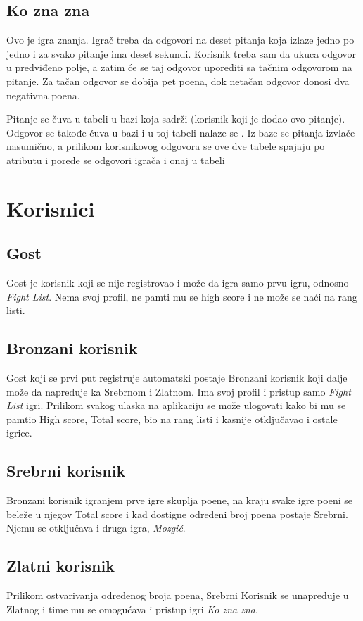 \documentclass{article}
\begin{document}
\subsection{Ko zna zna}
Ovo je igra znanja. Igrač treba da odgovori na deset pitanja koja izlaze jedno po jedno i 
za svako pitanje ima deset sekundi. Korisnik treba sam da ukuca odgovor u predviđeno polje, a 
zatim će se taj odgovor uporediti sa tačnim odgovorom na pitanje. Za tačan odgovor se dobija 
pet poena, dok netačan odgovor donosi dva negativna poena.
\par Pitanje se čuva u tabeli u bazi koja sadrži  (korisnik koji je 
dodao ovo pitanje). Odgovor se takođe čuva u bazi i u toj tabeli nalaze se . Iz baze se pitanja izvlače nasumično, a prilikom korisnikovog odgovora se ove dve 
tabele spajaju po atributu  i porede se odgovori igrača i onaj u tabeli
\newpage
\section{Korisnici}
\subsection{Gost}
Gost je korisnik koji se nije registrovao i može da igra samo prvu igru, odnosno \textit{Fight List}. 
Nema svoj profil, ne pamti mu se high score i ne može se naći na rang listi.
\subsection{Bronzani korisnik}
Gost koji se prvi put registruje automatski postaje Bronzani korisnik koji dalje može da 
napreduje ka Srebrnom i Zlatnom. Ima svoj profil i pristup samo \textit{Fight List} igri. Prilikom svakog 
ulaska na aplikaciju se može ulogovati kako bi mu se pamtio High score, Total score, bio na rang 
listi i kasnije otključavao i ostale igrice. 
\subsection{Srebrni korisnik}
Bronzani korisnik igranjem prve igre skuplja poene, na kraju svake igre poeni se beleže u 
njegov Total score i kad dostigne određeni broj poena postaje Srebrni. Njemu se otključava i 
druga igra, \textit{Mozgić}. 
\subsection{Zlatni korisnik}
Prilikom ostvarivanja određenog broja poena, Srebrni Korisnik se unapređuje u Zlatnog i 
time mu se omogućava i pristup igri \textit{Ko zna zna}. 
\end{document}
